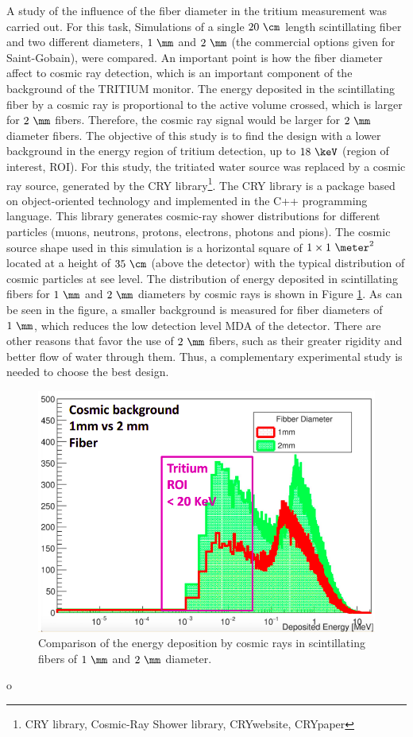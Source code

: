 A study of the influence of the fiber diameter in the tritium measurement was carried out. For this task, Simulations of a single $20~\cm$ length scintillating fiber and two different diameters, $1~\mm$ and $2~\mm$ (the commercial options given for Saint-Gobain), were compared. An important point is how the fiber diameter affect to cosmic ray detection, which is an important component of the background of the TRITIUM monitor. The energy deposited in the scintillating fiber by a cosmic ray is proportional to the active volume crossed, which is larger for $2~\mm$ fibers. Therefore, the cosmic ray signal would be larger for $2~\mm$ diameter fibers. The objective of this study is to find the design with a lower background in the energy region of tritium detection, up to $18~\keV$ (region of interest, ROI). For this study, the tritiated water source was replaced by a cosmic ray source, generated by the CRY library\footnote{CRY library, Cosmic-Ray Shower library, CRYwebsite, CRYpaper}. The CRY library is a package based on object-oriented technology and implemented in the C++ programming language. This library generates cosmic-ray shower distributions for different particles (muons, neutrons, protons, electrons, photons and pions). The cosmic source shape used in this simulation is a horizontal square of $1 \times 1~\meter ^2$ located at a height of $35~\cm$ (above the detector) with the typical distribution of cosmic particles at see level. The distribution of energy deposited in scintillating fibers for $1~\mm$ and $2~\mm$ diameters by cosmic rays is shown in Figure \ref{fig:DiameterComparison}. As can be seen in the figure, a smaller background is measured for fiber diameters of $1~\mm$, which reduces the low detection level MDA of the detector. There are other reasons that favor the use of $2~\mm$ fibers, such as their greater rigidity and better flow of water through them. Thus, a complementary experimental study is needed to choose the best design.

\begin{figure}[hbtp]
\centering
\includegraphics[scale=0.4]{Figures/8SimulationsResults/81TRITIUMDesign/814Diameter/ComparisonDiameter.png}
\caption{Comparison of the energy deposition by cosmic rays in scintillating fibers of $1~\mm$ and $2~\mm$ diameter.\label{fig:DiameterComparison}}
\end{figure}o